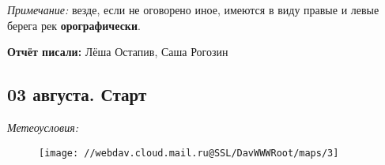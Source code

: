 \textit{Примечание:} везде, если не оговорено иное, имеются в виду правые и левые берега рек \textbf{орографически}.

\textbf{Отчёт писали:} Лёша Остапив, Саша Рогозин
\subsection{03 августа. Старт}
\textit{Метеоусловия: }

\begin{figure}[h!]
	\centering
	\texttt{[image: //webdav.cloud.mail.ru@SSL/DavWWWRoot/maps/3]}
	\label{fig:mini_18}
\end{figure}



\clearpage